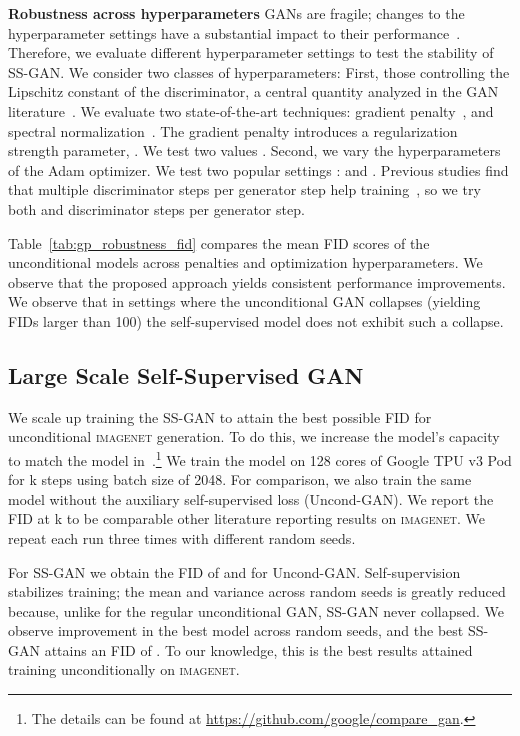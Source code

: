 \documentclass[10pt,twocolumn,letterpaper]{article}
\newcommand{\imagenet}{\textsc{imagenet}}
\begin{document}
\vspace{2mm}
\noindent\textbf{Robustness across hyperparameters}\quad
GANs are fragile; changes to the hyperparameter settings have a substantial impact to their performance~\citep{lucic2018,kurach2018gan}.
Therefore, we evaluate different hyperparameter settings to test the stability of SS-GAN.
We consider two classes of hyperparameters:
First, those controlling the Lipschitz constant of the discriminator, a central quantity analyzed in the GAN literature~\citep{ miyato2018spectral,zhou2018understanding}.
We evaluate two state-of-the-art techniques:
gradient penalty~\citep{gulrajani2017improved}, and spectral normalization~\citep{miyato2018spectral}.
The gradient penalty introduces a regularization strength parameter, .
We test two values .
Second, we vary the hyperparameters of the Adam optimizer.
We test two popular settings :  and .
Previous studies find that multiple discriminator steps per generator step help training~\citep{goodfellow2014generative,salimans2016improved},
so we try both  and  discriminator steps per generator step.

Table~\ref{tab:gp_robustness_fid} compares the mean FID scores of the unconditional models across penalties and optimization hyperparameters. We observe that the proposed approach yields consistent performance improvements.
We observe that in settings where the unconditional GAN collapses (yielding FIDs larger than 100) the self-supervised model does not exhibit such a collapse.

\subsection{Large Scale Self-Supervised GAN}

We scale up training the SS-GAN to attain the best possible FID for unconditional \imagenet{} generation.
To do this, we increase the model's capacity to match the model in~\citep{brock2018large}.\footnote{The details can be found at \url{https://github.com/google/compare\_gan}.}
We train the model on 128 cores of Google TPU v3 Pod for k steps using batch size of 2048. For comparison, we also train the same model without the auxiliary self-supervised loss (Uncond-GAN). We report the FID at k to be comparable other literature reporting results on \imagenet{}. We repeat each run three times with different random seeds.

For SS-GAN we obtain the FID of  and  for Uncond-GAN. Self-supervision stabilizes training; the mean and variance across random seeds is greatly reduced because, unlike for the regular unconditional GAN, SS-GAN never collapsed. We observe improvement in the best model across random seeds, and the best SS-GAN attains an FID of . To our knowledge, this is the best results attained training unconditionally on \imagenet{}.
\end{document}
